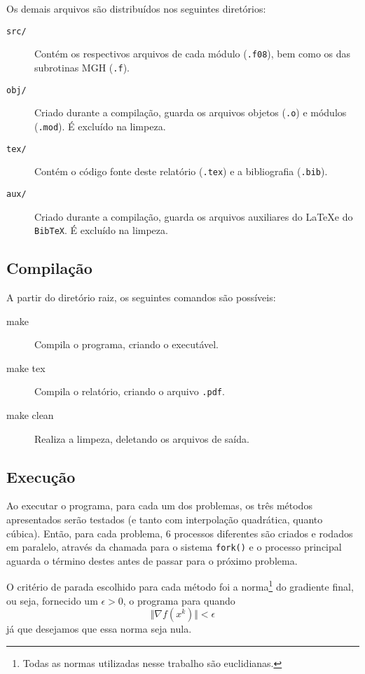\documentclass[a4paper,11pt]{article}
\begin{document}
            Os demais arquivos são distribuídos nos seguintes diretórios:
            \begin{description}
                \item[\texttt{src/}] Contém os respectivos arquivos de cada módulo (\texttt{.f08}), bem como os das subrotinas MGH (\texttt{.f}).
                \item[\texttt{obj/}] Criado durante a compilação, guarda os arquivos objetos (\texttt{.o}) e módulos (\texttt{.mod}). É excluído na limpeza.
                \item[\texttt{tex/}] Contém o código fonte deste relatório (\texttt{.tex}) e a bibliografia (\texttt{.bib}).
                \item[\texttt{aux/}] Criado durante a compilação, guarda os arquivos auxiliares do \LaTeX  e do \texttt{BibTeX}. É excluído na limpeza.
            \end{description}

        \subsection*{Compilação}
            A partir do diretório raiz, os seguintes comandos são possíveis:

            \begin{description}
                \item[make] Compila o programa, criando o executável.
                \item[make tex] Compila o relatório, criando o arquivo \texttt{.pdf}.
                \item[make clean] Realiza a limpeza, deletando os arquivos de saída.
            \end{description}

        \subsection*{Execução}
            Ao executar o programa, para cada um dos problemas, os três métodos apresentados serão testados (e tanto com interpolação quadrática, quanto cúbica).
            Então, para cada problema, 6 processos diferentes são criados e rodados em paralelo, através da chamada para o sistema \texttt{fork()} e o processo principal aguarda o término destes antes de passar para o próximo problema.

            O critério de parada escolhido para cada método foi a norma\footnote{Todas as normas utilizadas nesse trabalho são euclidianas.} do gradiente final, ou seja, fornecido um $\epsilon > 0$, o programa para quando
                $$ \Vert \nabla f(x^k) \Vert < \epsilon $$
            já que desejamos que essa norma seja nula.
\end{document}
